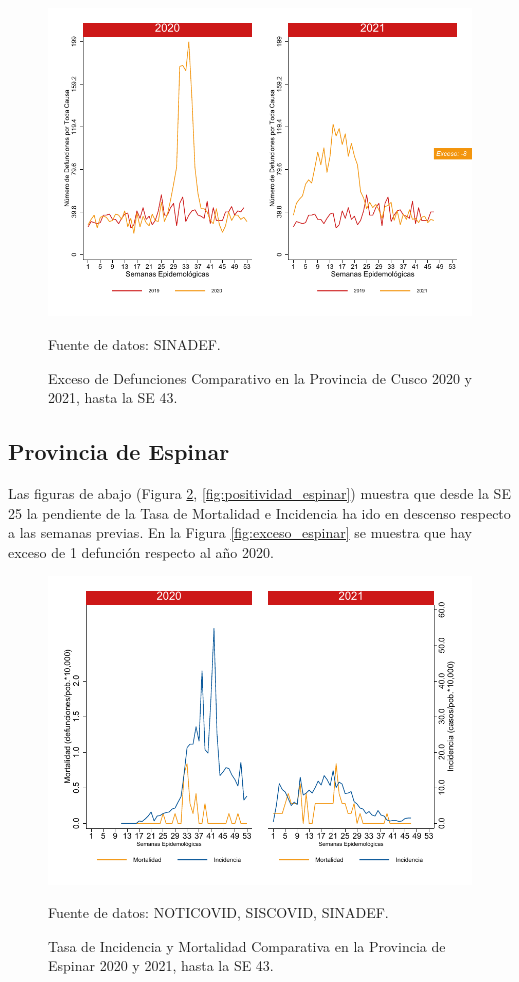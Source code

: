 \documentclass[12pt,a4paper,openany]{book}
\begin{document}
		\begin{figure}[h]
			\caption{Exceso de Defunciones Comparativo en la Provincia de Cusco  2020 y 2021, hasta la SE 43.}\label{fig:exceso_cusco}
			\begin{center}
				\includegraphics[width=0.7\linewidth]{../figuras/exceso_7}
			\end{center}
			{\footnotesize {Fuente de datos: SINADEF.}}
		\end{figure}
		
		\clearpage
		
		\subsection*{Provincia de Espinar}
		\noindent Las figuras de abajo (Figura \ref{fig:inc_mort_espinar}, \ref{fig:positividad_espinar}) muestra que desde la SE 25 la pendiente de la Tasa de Mortalidad e Incidencia ha ido en descenso respecto a las semanas previas. En la Figura \ref{fig:exceso_espinar} se muestra que hay exceso de 1 defunción respecto al año 2020.
		
		\begin{figure}[h]
			\caption{Tasa de Incidencia y Mortalidad Comparativa en la Provincia de Espinar 2020 y 2021, hasta la SE 43.}\label{fig:inc_mort_espinar}
			\begin{center}
				\includegraphics[width=0.7\linewidth]{../figuras/incidencia_mortalidad_20_21_8}
			\end{center}
			{\footnotesize {Fuente de datos: NOTICOVID, SISCOVID, SINADEF.}}
		\end{figure}
		
\end{document}
